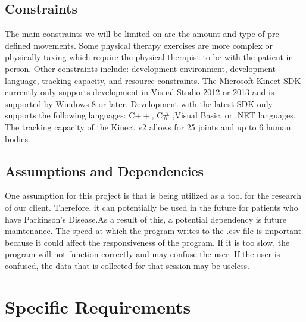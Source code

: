 \documentclass[onecolumn, draftclsnofoot,10pt, compsoc]{IEEEtran}
\begin{document}
\subsection{Constraints}
The main constraints we will be limited on are the amount and type of pre-defined 
movements. Some physical therapy exercises are more complex or physically taxing which 
require the physical therapist to be with the patient in person. Other constraints 
include: development environment, development language, tracking capacity, and 
resource constraints. The Microsoft Kinect SDK currently only supports development in 
Visual Studio 2012 or 2013 and is supported by Windows 8 or later. Development with 
the latest SDK only supports the following languages: C$++$, C\# ,Visual Basic, or .NET 
languages. The tracking capacity of the Kinect v2 allows for 25 joints and up to 6 
human bodies\cite{KinectConstraints}.

\subsection{Assumptions and Dependencies}
One assumption for this project is that is being utilized as a tool for the research 
of our client. Therefore, it can potentially be used in the future for patients who 
have Parkinson's Disease.As a result of this, a potential dependency is future 
maintenance. The speed at which the program writes to the .csv file is important 
because it could affect the responsiveness of the program. If it is too slow, the 
program will not function correctly and may confuse the user. If the user is confused, 
the data that is collected for that session may be useless.

\section{Specific Requirements}
\end{document}
